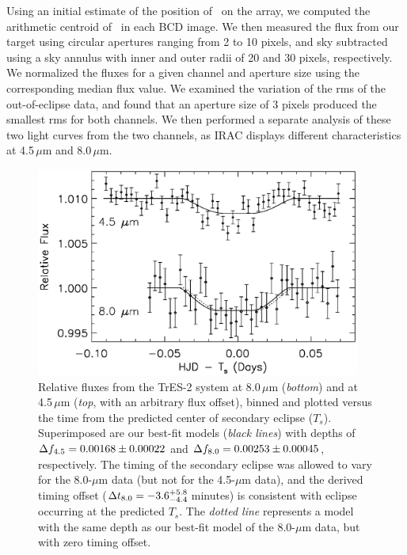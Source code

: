 Using an initial estimate of the position of \tresTwo\ on the array, we computed the arithmetic centroid of \tresTwo\ in each BCD image. 
We then measured the flux from our target using circular apertures ranging from 2 to 10 pixels, and sky subtracted using a sky annulus with inner and outer radii of 20 and 30 pixels, respectively. 
We normalized the fluxes for a given channel and aperture size using the corresponding median flux value. 
We examined the variation of the rms of the out-of-eclipse data, and found that an aperture size of 3 pixels produced the smallest rms for both channels. 
We then performed a separate analysis of these two light curves from the two channels, as IRAC displays different characteristics at 4.5\,$\mu$m and 8.0\,$\mu$m. 

\begin{figure}
\begin{center}
\includegraphics[width=0.95\textwidth]{6_f1}
\caption[%
Near-infrared relative fluxes from TrES-2 from {\it Spitzer} observations]{%
Relative fluxes from the TrES-2 system at 8.0\,$\mu$m ({\it bottom}) and at 4.5\,$\mu$m ({\it top}, with an arbitrary flux offset), binned and plotted versus the time from the predicted center of secondary eclipse ($T_{s}$). 
Superimposed are our best-fit models (\emph{black lines}) with depths of \mbox{$\Delta f_{\rm {4.5}} = 0.00168 \pm 0.00022$} and \mbox{$\Delta f_{\rm {8.0}} = 0.00253 \pm 0.00045$}, respectively.
The timing of the secondary eclipse was allowed to vary for the 8.0-$\mu$m data (but not for the 4.5-$\mu$m data), and the derived timing offset (\mbox{$\Delta t_{\rm {8.0}} = -3.6^{+5.8}_{-4.4}$\,minutes}) is consistent with eclipse occurring at the predicted $T_{s}$.
The \emph{dotted line} represents a model with the same depth as our best-fit model of the 8.0-$\mu$m data, but with zero timing offset.%
}
\label{cha:spitzer:fig:tres2_combplot}
\end{center}
\end{figure} 


